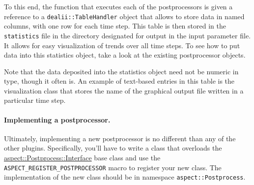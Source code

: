 \documentclass{article}
\begin{document}
To this end, the function that executes each of the postprocessors is given a
reference to a \texttt{dealii::TableHandler} object that allows to store data
in named columns, with one row for each time step. This table is then stored
in the \texttt{statistics} file in the directory designated for output in the
input parameter file. It allows for easy visualization of trends over all time
steps. To see how to put data into this statistics object, take a look at the
existing postprocessor objects.

Note that the data deposited into the statistics object need not be numeric in
type, though it often is. An example of text-based entries in this table is
the visualization class that stores the name of the graphical output file
written in a particular time step.

\paragraph{Implementing a postprocessor.}
Ultimately, implementing a new postprocessor is no different than any of the
other plugins. Specifically, you'll have to write a class that
overloads the
\href{doc/doxygen/classaspect_1_1Postprocess_1_1Interface.html}{aspect::Postprocess::Interface}
base class and use
the \texttt{ASPECT\_REGISTER\_POSTPROCESSOR} macro to register your new
class. The implementation of the new class should be in namespace
\texttt{aspect::Postprocess}.
\end{document}
